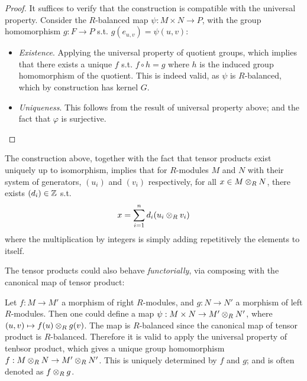 \documentclass{article}
\begin{document}
\begin{proof}
    It suffices to verify that the construction is compatible with the universal property. Consider the $R$-balanced map $\psi: M \times N \to P$, with the group homomorphism $g: F \to P$ s.t. $g(e_{u, v}) = \psi(u, v)$:
    \begin{figure}[htbp]
        \centering
    \end{figure}
    \begin{itemize}
        \item \emph{Existence}. Applying the universal property of quotient groups, which implies that there exists a unique $f$ s.t. $f \circ h = g$ where $h$ is the induced group homomorphism of the quotient. This is indeed valid, as $\psi$ is $R$-balanced, which by construction has kernel $G$.
        \item \emph{Uniqueness}. This follows from the result of universal property above; and the fact that $\varphi$ is surjective.
    \end{itemize}
\end{proof}

\begin{remark}\label{Rmk:decomp of tensor}
    The construction above, together with the fact that tensor products exist uniquely up to isomorphism, implies that for $R$-modules $M$ and $N$ with their system of generators, $(u_i)$ and $(v_i)$ respectively, for all $x \in M \otimes_R N$, there exists $(d_i) \in \mathbb{Z}$ s.t.
    \[
        x = \sum\limits_{i=1}^n d_i (u_i \otimes_R v_i)
    \]
    where the multiplication by integers is simply adding repetitively the elements to itself.
\end{remark}

The tensor products could also behave \emph{functorially}, via composing with the canonical map of tensor product:

Let $f: M \to M'$ a morphism of right $R$-modules, and $g: N \to N'$ a morphism of left $R$-modules. Then one could define a map $\psi: M \times N \to M' \otimes_R N'$, where $(u, v) \mapsto f(u) \otimes_R g(v)$. The map is $R$-balanced since the canonical map of tensor product is $R$-balanced. Therefore it is valid to apply the universal property of tenbsor product, which gives a unique group homomorphism $f: M \otimes_R N \to M' \otimes_R N' $. This is uniquely determined by $f$ and $g$; and is often denoted as $f \otimes_R g$. 
\end{document}
